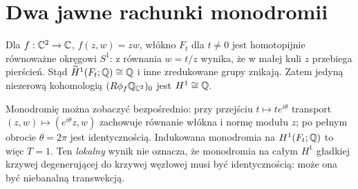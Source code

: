 \section{Dwa jawne rachunki monodromii}
\begin{przyklad}[Węzeł płaski $f(z,w)=zw$]
\label{ex:node-monodromy-xiv}
Dla $f:\mathbb{C}^2\to\mathbb{C}$, $f(z,w)=zw$, włókno
$F_t$ dla $t\ne0$ jest homotopijnie równoważne
okręgowi $S^1$: z równania $w=t/z$ wynika,
że w małej kuli $z$ przebiega pierścień.
Stąd $\widetilde H^1(F_t;\mathbb{Q})\cong\mathbb{Q}$
i inne zredukowane grupy znikają.
Zatem jedyną niezerową kohomologią
$(R\phi_f\mathbb{Q}_{\mathbb{C}^2})_0$ jest $H^1\cong\mathbb{Q}$.

Monodromię można zobaczyć bezpośrednio:
przy przejściu $t\mapsto te^{i\theta}$
transport $(z,w)\mapsto(e^{i\theta}z,w)$
zachowuje równanie włókna i normę modułu $z$;
po pełnym obrocie $\theta=2\pi$ jest identycznością.
Indukowana monodromia na $H^1(F_t;\mathbb{Q})$ to więc $T=1$.
Ten \emph{lokalny} wynik nie oznacza, że monodromia
na całym $H^1$ gładkiej krzywej degenerującej
do krzywej węzłowej musi być identycznością:
może ona być niebanalną transwekcją.
\end{przyklad}

